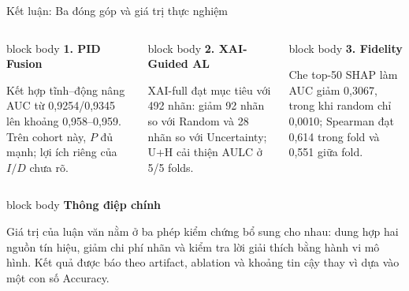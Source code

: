 \documentclass[aspectratio=169,10pt]{beamer}
\newenvironment{bluebox}[1]{%
  \begin{beamercolorbox}[rounded=true,shadow=true,sep=0.18cm]{block body}%
  {\color{uetblue}\textbf{#1}}\par\vspace{0.08cm}\color{ink}%
}{\end{beamercolorbox}}
\begin{document}
\begin{frame}[t]{Kết luận: Ba đóng góp và giá trị thực nghiệm}
\begin{columns}[T,onlytextwidth]
\begin{bluebox}{1. PID Fusion}
\small
Kết hợp tĩnh--động nâng AUC từ 0,9254/0,9345 lên khoảng 0,958--0,959. Trên cohort này, $P$ đủ mạnh; lợi ích riêng của $I/D$ chưa rõ.
\end{bluebox}

\begin{bluebox}{2. XAI-Guided AL}
\small
XAI-full đạt mục tiêu với 492 nhãn: giảm 92 nhãn so với Random và 28 nhãn so với Uncertainty; U+H cải thiện AULC ở 5/5 folds.
\end{bluebox}

\begin{bluebox}{3. Fidelity}
\small
Che top-50 SHAP làm AUC giảm 0,3067, trong khi random chỉ 0,0010; Spearman đạt 0,614 trong fold và 0,551 giữa fold.
\end{bluebox}
\end{columns}

\vspace{0.28cm}
\begin{bluebox}{Thông điệp chính}
Giá trị của luận văn nằm ở ba phép kiểm chứng bổ sung cho nhau: dung hợp hai nguồn tín hiệu, giảm chi phí nhãn và kiểm tra lời giải thích bằng hành vi mô hình. Kết quả được báo theo artifact, ablation và khoảng tin cậy thay vì dựa vào một con số Accuracy.
\end{bluebox}

\vfill
{}
\end{frame}
\end{document}

